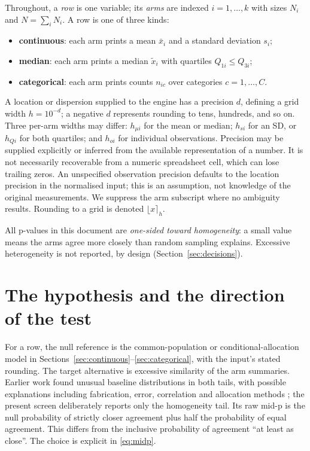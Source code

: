 \documentclass[11pt,a4paper]{article}
\begin{document}
Throughout, a \emph{row} is one variable; its \emph{arms} are indexed $i = 1,\dots,k$ with sizes $N_i$ and $N = \sum_i N_i$. A row is one of three kinds:
\begin{itemize}
\item \textbf{continuous}: each arm prints a mean $\bar{x}_i$ and a standard deviation $s_i$;
\item \textbf{median}: each arm prints a median $\tilde{x}_i$ with quartiles $Q_{1i} \le Q_{3i}$;
\item \textbf{categorical}: each arm prints counts $n_{ic}$ over categories $c = 1,\dots,C$.
\end{itemize}
A location or dispersion supplied to the engine has a precision $d$, defining a grid width $h=10^{-d}$; a negative $d$ represents rounding to tens, hundreds, and so on. Three per-arm widths may differ: $h_{\mu i}$ for the mean or median; $h_{s i}$ for an SD, or $h_{Q i}$ for both quartiles; and $h_{o i}$ for individual observations. Precision may be supplied explicitly or inferred from the available representation of a number. It is not necessarily recoverable from a numeric spreadsheet cell, which can lose trailing zeros. An unspecified observation precision defaults to the location precision in the normalised input; this is an assumption, not knowledge of the original measurements. We suppress the arm subscript where no ambiguity results. Rounding to a grid is denoted $\lfloor x\rceil_h$.

All p-values in this document are \emph{one-sided toward homogeneity}: a small value means the arms agree more closely than random sampling explains. Excessive heterogeneity is not reported, by design (Section~\ref{sec:decisions}).

\section{The hypothesis and the direction of the test}
\label{sec:hypothesis}

For a row, the null reference is the common-population or conditional-allocation model in Sections~\ref{sec:continuous}--\ref{sec:categorical}, with the input's stated rounding. The target alternative is excessive similarity of the arm summaries. Earlier work found unusual baseline distributions in both tails, with possible explanations including fabrication, error, correlation and allocation methods \citep{carlisle2017}; the present screen deliberately reports only the homogeneity tail. Its raw mid-p is the null probability of strictly closer agreement plus half the probability of equal agreement. This differs from the inclusive probability of agreement ``at least as close''. The choice is explicit in \eqref{eq:midp}.
\end{document}
